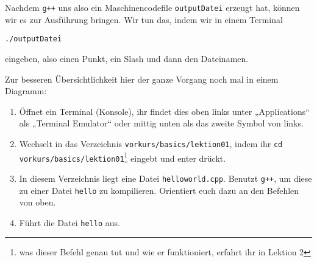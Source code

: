 Nachdem \texttt{g++} uns also ein Maschinencodefile \texttt{outputDatei}
erzeugt hat, können wir es zur Ausführung bringen. Wir tun das, indem wir in
einem Terminal
\begin{center}
    \texttt{./outputDatei}
\end{center}
eingeben, also einen Punkt, ein Slash und dann den Dateinamen.

Zur besseren Übersichtlichkeit hier der ganze Vorgang noch mal in einem
Diagramm:

\begin{center}
\end{center}

\begin{praxis}
    \begin{enumerate}
        \item Öffnet ein Terminal (Konsole), ihr findet dies oben links unter „Applications“ als „Terminal Emulator“ oder mittig unten als das zweite Symbol von links.
        \item Wechselt in das Verzeichnis \texttt{vorkurs/basics/lektion01}, indem ihr
              \texttt{cd vorkurs/basics/lektion01}\footnote{was dieser Befehl genau tut und wie er funktioniert, erfahrt ihr in Lektion 2} eingebt und enter drückt.
        \item In diesem Verzeichnis liegt eine Datei \texttt{helloworld.cpp}.
              Benutzt \texttt{g++}, um diese zu einer Datei \texttt{hello} zu
              kompilieren. Orientiert euch dazu an den Befehlen von oben.
        \item Führt die Datei \texttt{hello} aus.
    \end{enumerate}
\end{praxis}

